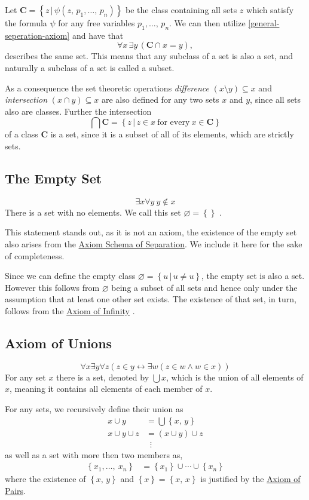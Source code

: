 \documentclass[../../main.tex]{subfiles}
\begin{document}
Let $\mathbf{C} = \left\{z \,\vert\, \psi(z,\, p_1,\ldots,\, p_n)\right\}$ be the class containing all sets $z$ which satisfy the formula $\psi$ for any free variables $p_1,\ldots,\, p_n$.
We can then utilize \eqref{general-seperation-axiom} and have that
$$\forall x \, \exists y \, \left(\mathbf{C} \cap x = y\right),$$
describes the same set.
This means that any subclass of a set is also a set, and naturally a subclass of a set is called a subset. 

As a consequence the set theoretic operations \textit{difference} $\left(x \setminus y\right) \subseteq x$ and \textit{intersection} $\left(x \cap y\right) \subseteq x$ are also defined for any two sets $x$ and $y$,
since all sets also are classes.
Further the intersection 
$$\bigcap \mathbf{C} = \left\{z \,\vert\, z \in x \ \text{for every}\ x \in \mathbf{C}\right\}$$
of a class $\mathbf{C}$ is a set, since it is a subset of all of its elements, which are strictly sets. \cite[pp.5-6]{Jec78}

\subsection{The Empty Set}\label{ZF4}
$$\exists x \forall y \ y \notin x$$
There is a set with no elements. We call this set $\varnothing = \left\{\right\}$ \cite[p.76]{Gol17}.

This statement stands out, as it is not an axiom, the existence of the empty set also arises from the \hyperref[ZF3]{Axiom Schema of Separation}.
We include it here for the sake of completeness.

Since we can define the empty class $\varnothing = \left\{u\, \vert\, u \neq u\right\}$, the empty set is also a set.
However this follows from $\varnothing$ being a subset of all sets and hence only under the assumption that at least one other set exists.
The existence of that set, in turn, follows from the \hyperref[ZF7]{Axiom of Infinity} \cite[p.6]{Jec78}.

\subsection{Axiom of Unions}\label{ZF5}
$$\forall x \exists y \forall z \left(z \in y \leftrightarrow \exists w \left(z \in w \wedge w \in x\right)\right)$$
For any set $x$ there is a set, denoted by $\bigcup x$, which is the union of all elements of $x$,
meaning it contains all elements of each member of $x$.

For any sets, we recursively define their union as
\begin{align*}
    x \cup y &= \bigcup \left\{x,\, y\right\} \\
    x \cup y \cup z &= \left(x \cup y\right) \cup z \\
    &\,\,\, \vdots
\end{align*}
as well as a set with more then two members as,
\begin{align*}
    \left\{x_1,\ldots,\ x_n\right\} &= \left\{x_1\right\} \cup \cdots \cup \left\{x_n\right\}
\end{align*}
where the existence of $\left\{x,\, y\right\}$ and $\left\{x\right\} = \left\{x,\, x\right\}$ is justified by the \hyperref[ZF2]{Axiom of Pairs}. \cite[p.6]{Jec78}
\end{document}
